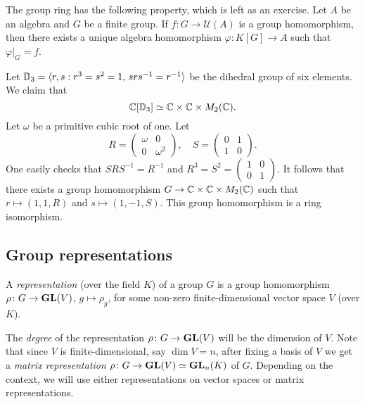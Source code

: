 The group ring has the following property, which is left as an exercise. 
Let $A$ be an algebra and
$G$ be a finite group. If $f\colon G\to\mathcal{U}(A)$ is a group homomorphism, 
then there exists a unique algebra homomorphism $\varphi\colon K[G]\to A$ such that
$\varphi|_G=f$. 

\begin{example}
	Let $\mathbb{D}_3=\langle r,s:r^3=s^2=1,\,srs^{-1}=r^{-1}\rangle$ be the dihedral
	group of six elements. We claim that 
	\[
	\mathbb{C}[\mathbb{D}_3]\simeq\mathbb{C}\times\mathbb{C}\times M_2(\mathbb{C}).
	\]
	Let $\omega$ be a primitive cubic root of one. Let 
	\[
	R=\begin{pmatrix}
		\omega&0\\
		0&\omega^2	
	\end{pmatrix},
	\quad
	S=\begin{pmatrix}
		0&1\\
		1&0
	\end{pmatrix}.
 	\]
 	One easily checks that $SRS^{-1}=R^{-1}$ and $R^3=S^2=\begin{pmatrix}
		1&0\\
		0&1	
	\end{pmatrix}$. It follows that there exists a group homomorphism
	$G\to\mathbb{C}\times\mathbb{C}\times M_2(\mathbb{C})$ such that
	$r\mapsto (1,1,R)$ and $s\mapsto (1,-1,S)$. This group homomorphism
	is a ring isomorphism.  
\end{example}


\subsection{Group representations}

\begin{definition}
	A \emph{representation} (over the field $K$) of a group $G$ is a group homomorphism
	$\rho\colon G\to\mathbf{GL}(V)$, $g\mapsto\rho_g$, for some non-zero finite-dimensional 
        vector space $V$ (over $K$).
\end{definition}

The \emph{degree} of the representation $\rho\colon G\to\mathbf{GL}(V)$ will be the dimension of $V$. Note that
since $V$ is finite-dimensional, say $\dim V=n$, after fixing a basis of $V$ we get a \emph{matrix representation} 
$\rho\colon G\to\mathbf{GL}(V)\simeq\mathbf{GL}_n(K)$ of $G$. Depending on the context, we will use either representations on vector spaces or matrix representations.  

